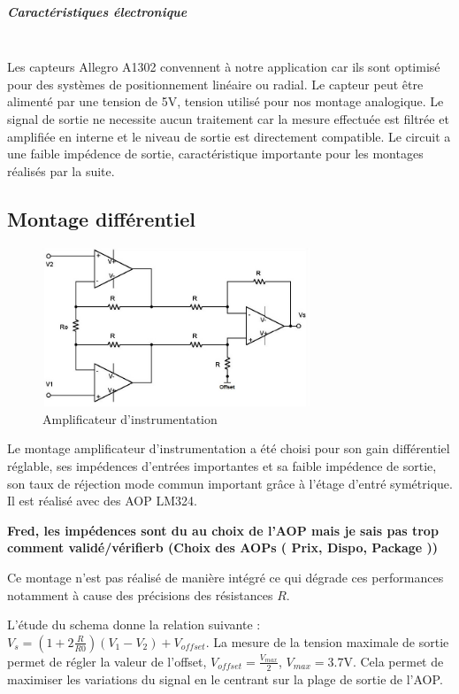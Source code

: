 \documentclass[11pt, french]{article} %
\begin{document}
\subparagraph*{Caractéristiques électronique}~\\
Les capteurs Allegro A1302 convennent à notre application car ils sont optimisé pour des systèmes de positionnement linéaire ou radial. Le capteur peut être alimenté par une tension de 5V, tension utilisé pour nos montage analogique. Le signal de sortie ne necessite aucun traitement car la mesure effectuée est filtrée et amplifiée en interne et le niveau de sortie est directement compatible. Le circuit a une faible impédence de sortie, caractéristique importante pour les montages réalisés par la suite.

\subsection{Montage différentiel}

\begin{figure}
  \includegraphics[width=8cm]{SolutionAnalogique/AmpInst}
  \caption{Amplificateur d'instrumentation}
\end{figure}
Le montage amplificateur d'instrumentation a été choisi pour son gain différentiel réglable, ses impédences d'entrées importantes et sa faible impédence de sortie, son taux de réjection mode commun important grâce à l'étage d'entré symétrique. Il est réalisé avec des AOP LM324.

\textbf{Fred, les impédences sont du au choix de l'AOP mais je sais pas trop comment validé/vérifierb (Choix des AOPs ( Prix, Dispo, Package ))}

Ce montage n'est pas réalisé de manière intégré ce qui dégrade ces performances notamment à cause des précisions des résistances $R$.

L'étude du schema donne la relation suivante : $V_s=(1+2 \frac{R}{R0})(V_1-V_2) + V_{offset}$. La mesure de la tension maximale de sortie permet de régler la valeur de l'offset, $V_{offset}=\frac{V_{max}}{2}$, $V_{max}=3.7$V. Cela permet de maximiser les variations du signal en le centrant sur la plage de sortie de l'AOP.
\end{document}
